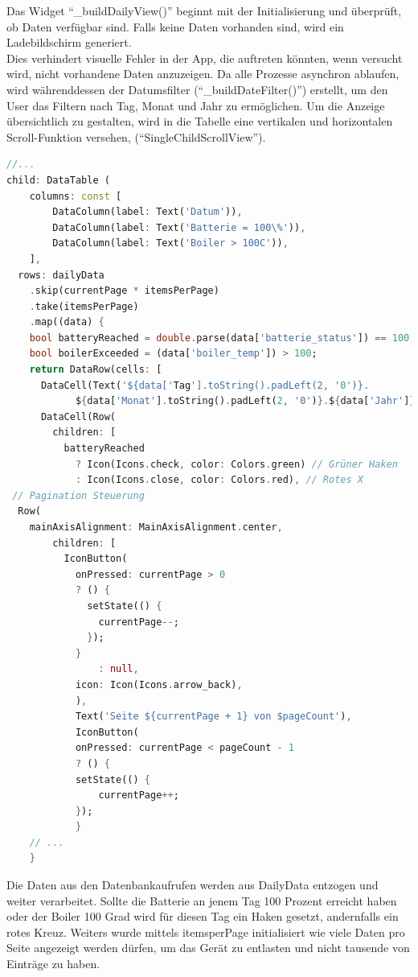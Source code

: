 \documentclass{article}
\begin{document}
    Das Widget \enquote{\_buildDailyView()} beginnt mit der Initialisierung und überprüft, ob Daten verfügbar sind.
    Falls keine Daten vorhanden sind, wird ein Ladebildschirm generiert. \\
    Dies verhindert visuelle Fehler in der App, die auftreten könnten, wenn versucht wird, nicht vorhandene Daten anzuzeigen.
    Da alle Prozesse asynchron ablaufen, wird währenddessen der Datumsfilter (\enquote{\_buildDateFilter()}) erstellt,
    um den User das Filtern nach Tag, Monat und Jahr zu ermöglichen.
    Um die Anzeige übersichtlich zu gestalten, wird in die Tabelle eine vertikalen und horizontalen
    Scroll-Funktion versehen, (\enquote{SingleChildScrollView}).
    \begin{lstlisting}[language=Dart]
      //...
child: DataTable (
    columns: const [
        DataColumn(label: Text('Datum')),
        DataColumn(label: Text('Batterie = 100\%')),
        DataColumn(label: Text('Boiler > 100C')),
    ],
  rows: dailyData
    .skip(currentPage * itemsPerPage)
    .take(itemsPerPage)
    .map((data) {
    bool batteryReached = double.parse(data['batterie_status']) == 100;
    bool boilerExceeded = (data['boiler_temp']) > 100;
    return DataRow(cells: [
      DataCell(Text('${data['Tag'].toString().padLeft(2, '0')}.
            ${data['Monat'].toString().padLeft(2, '0')}.${data['Jahr']}')),
      DataCell(Row(
        children: [
          batteryReached
            ? Icon(Icons.check, color: Colors.green) // Grüner Haken
            : Icon(Icons.close, color: Colors.red), // Rotes X
 // Pagination Steuerung
  Row(
    mainAxisAlignment: MainAxisAlignment.center,
        children: [
          IconButton(
            onPressed: currentPage > 0
            ? () {
              setState(() {
                currentPage--;
              });
            }
                : null,
            icon: Icon(Icons.arrow_back),
            ),
            Text('Seite ${currentPage + 1} von $pageCount'),
            IconButton(
            onPressed: currentPage < pageCount - 1
            ? () {
            setState(() {
                currentPage++;
            });
            }
    // ...
    }
    \end{lstlisting}
    Die Daten aus den Datenbankaufrufen werden aus DailyData entzogen und weiter verarbeitet. Sollte die Batterie an
    jenem Tag 100 Prozent erreicht haben oder der Boiler 100 Grad wird für diesen Tag ein Haken gesetzt,
    andernfalls ein rotes Kreuz. Weiters wurde mittels itemsperPage initialisiert wie viele Daten pro Seite
    angezeigt werden dürfen, um das Gerät zu entlasten und nicht tausende von Einträge zu haben.
\end{document}
